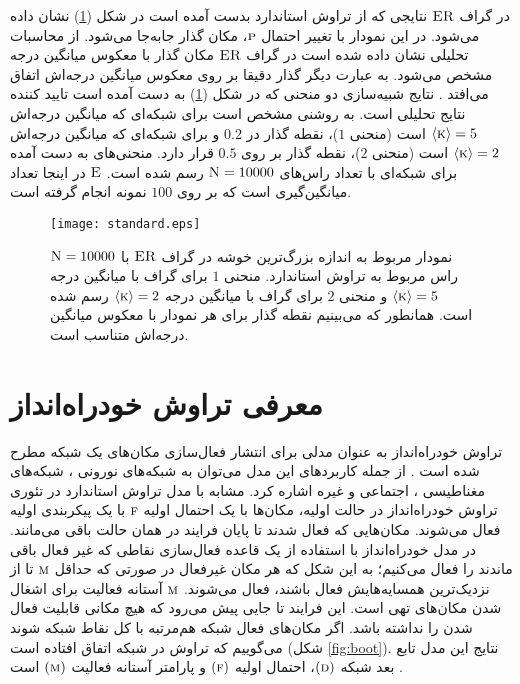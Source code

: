    
   در گراف
    $\textsc{ER}$
     نتایجی که از تراوش استاندارد بدست آمده است در شکل (\ref{fig:SP}) نشان داده می‌شود. در این نمودار با تغییر احتمال 
$\textsc{p}$، مکان گذار جابه‌جا می‌شود. از محاسبات تحلیلی نشان داده شده است در گراف 
 $\textsc{ER}$ 
 مکان گذار با معکوس میانگین درجه مشخص می‌شود. به عبارت دیگر گذار دقیقا بر روی معکوس میانگین درجه‌اش اتفاق می‌افتد \cite{newman}. نتایج شبیه‌سازی دو منحنی که در شکل  (\ref{fig:SP}) به دست آمده است تایید کننده نتایج تحلیلی است. به روشنی مشخص است برای شبکه‌ای که میانگین درجه‌اش
  $\left\langle \textsc{k} \right\rangle  = 5$
   است (منحنی $1$)، نقطه گذار در $0.2$ و برای شبکه‌ای که میانگین درجه‌اش
    $\left\langle \textsc{k}\right\rangle  = 2$
     است (منحنی $2$)، نقطه گذار بر روی $0.5$ قرار دارد. منحنی‌های به دست آمده برای شبکه‌ای با تعداد راس‌های 
     $\textsc{N} = 10000$
      رسم شده است. 
      $\textsc{E}$
       در اینجا تعداد میانگین‌گیری است که  بر روی  $100$  نمونه انجام گرفته است. 
   \begin{figure} [htbp]
   \centering
   \texttt{[image: standard.eps]} 
   \caption[نمودار مربوط به اندازه بزرگ‌ترین خوشه در گراف  
   $\textsc{ER}$
   ] {\vspace{-0.01}\footnotesize نمودار مربوط به اندازه بزرگ‌ترین خوشه در گراف 
    $\textsc{ER}$ 
    با 
    $\textsc{N}=10000$
     راس مربوط به تراوش استاندارد. منحنی‌ $1$ برای گراف با میانگین درجه
      $\left\langle \textsc{k} \right\rangle = 5$ 
      و منحنی $2$ برای گراف با میانگین درجه 
      $\left\langle \textsc{k} \right\rangle = 2$ 
      رسم شده است. همانطور که می‌بینیم نقطه گذار برای هر نمودار با معکوس میانگین‌ درجه‌اش متناسب است.}
   \label{fig:SP}
   \end{figure}
 
 
 
 \newpage
 \section{معرفی تراوش خود‌راه‌انداز}
 تراوش خودراه‌انداز به عنوان مدلی برای انتشار  فعال‌سازی مکان‌های یک شبکه مطرح شده است \cite{cohen}. از جمله کاربرد‌های این مدل می‌توان به شبکه‌های نورونی \cite{ec}، شبکه‌های مغناطیسی \cite{baxter}، اجتماعی \cite{camp} و غیره اشاره کرد.  
مشابه با  مدل تراوش استاندارد در تئوری تراوش خود‌راه‌انداز در حالت اولیه، مکان‌ها با یک احتمال اولیه $\textsc{f}$ با یک پیکربندی اولیه فعال می‌شوند. مکان‌هایی که فعال شدند تا پایان فرایند در همان حالت باقی می‌مانند. در مدل خود‌راه‌انداز با استفاده از یک قاعده فعال‌سازی نقاطی که غیر فعال باقی ماندند را فعال می‌کنیم؛ به این شکل که هر مکان غیرفعال در صورتی که ‌حداقل
 $\textsc{m}$ 
 تا از نزدیک‌ترین همسایه‌هایش فعال باشند، فعال می‌‌شوند. 
 $\textsc{m}$
   آستانه فعالیت برای اشغال شدن مکان‌های تهی است. این فرایند تا جایی پیش می‌رود که هیچ مکانی قابلیت فعال شدن را نداشته باشد. اگر مکان‌های فعال شبکه هم‌مرتبه با کل نقاط شبکه شوند می‌گوییم که تراوش در شبکه اتفاق افتاده‌ است (شکل \ref{fig:boot}). نتایج این مدل  تابع بعد شبکه 
   $(\textsc{d})$، احتمال اولیه 
   $(\textsc{f})$ 
   و پارامتر آستانه فعالیت 
   $(\textsc{m})$
    است \cite{grav}. 
 
